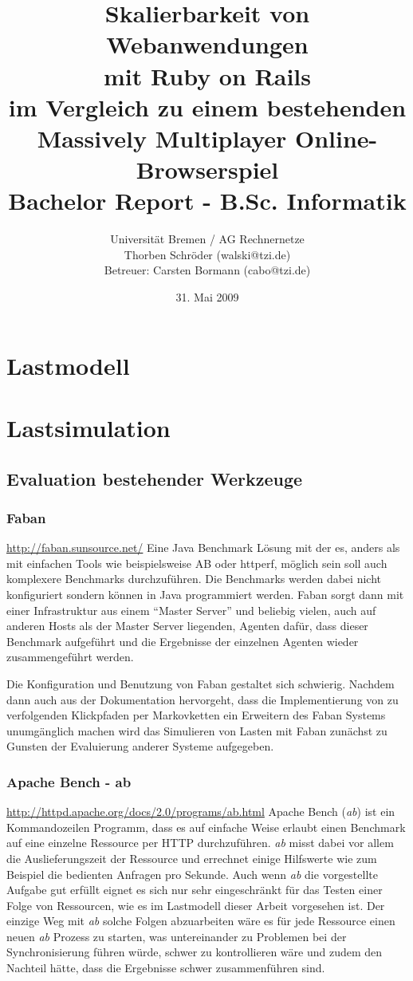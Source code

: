 \documentclass[1p]{scrartcl}
\title{Skalierbarkeit von Webanwendungen\\mit Ruby on Rails\\
\small{im Vergleich zu einem bestehenden\\Massively Multiplayer Online-Browserspiel}\\
\small{Bachelor Report - B.Sc. Informatik}\\
}
\author{Universität Bremen / AG Rechnernetze\\Thorben Schröder (walski@tzi.de)\\Betreuer: Carsten Bormann (cabo@tzi.de)}
\date{31. Mai 2009}
\begin{document}
\maketitle

\tableofcontents
\newpage

  \section{Lastmodell}
  \section{Lastsimulation}
  \subsection{Evaluation bestehender Werkzeuge}
  \subsubsection{Faban}
  \url{http://faban.sunsource.net/}
  Eine Java Benchmark Lösung mit der es, anders als mit einfachen Tools wie
  beispielsweise AB oder httperf, möglich sein soll auch komplexere Benchmarks
  durchzuführen. Die Benchmarks werden dabei nicht konfiguriert sondern können
  in Java programmiert werden. Faban sorgt dann mit einer Infrastruktur aus 
  einem ``Master Server'' und beliebig vielen, auch auf anderen Hosts als der
  Master Server liegenden, Agenten dafür, dass dieser Benchmark aufgeführt und
  die Ergebnisse der einzelnen Agenten wieder zusammengeführt werden.
  
  Die Konfiguration und Benutzung von Faban gestaltet sich schwierig. Nachdem 
  dann auch aus der Dokumentation hervorgeht, dass die Implementierung von
  zu verfolgenden Klickpfaden per Markovketten ein Erweitern des Faban Systems
  unumgänglich machen wird das Simulieren von Lasten mit Faban zunächst zu 
  Gunsten der Evaluierung anderer Systeme aufgegeben.
  
  \subsubsection{Apache Bench - ab}
  \url{http://httpd.apache.org/docs/2.0/programs/ab.html}
  Apache Bench (\textit{ab}) ist ein Kommandozeilen Programm, dass es auf einfache Weise
  erlaubt einen Benchmark auf eine einzelne Ressource per HTTP durchzuführen.
  \textit{ab} misst dabei vor allem die Auslieferungszeit der Ressource und errechnet
  einige Hilfswerte wie zum Beispiel die bedienten Anfragen pro Sekunde.
  Auch wenn \textit{ab} die vorgestellte Aufgabe gut erfüllt eignet es sich nur sehr
  eingeschränkt für das Testen einer Folge von Ressourcen, wie es im Lastmodell
  dieser Arbeit vorgesehen ist. Der einzige Weg mit \textit{ab} solche Folgen 
  abzuarbeiten wäre es für jede Ressource einen neuen \textit{ab} Prozess zu starten, was
  untereinander zu Problemen bei der Synchronisierung führen würde, 
  schwer zu kontrollieren wäre und zudem den Nachteil hätte, dass die Ergebnisse
  schwer zusammenführen sind.
  
\end{document}
